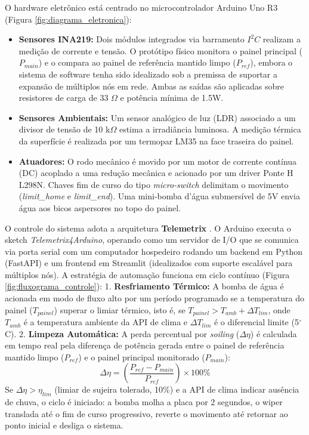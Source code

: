 \documentclass[a4paper,11pt]{article}
\begin{document}
O hardware eletrônico está centrado no microcontrolador Arduino Uno R3 (Figura \ref{fig:diagrama_eletronica}):
\begin{itemize}\setlength{\itemsep}{0pt}
    \item \textbf{Sensores INA219:} Dois módulos integrados via barramento $I^2C$ realizam a medição de corrente e tensão. O protótipo físico monitora o painel principal ($P_{main}$) e o compara ao painel de referência mantido limpo ($P_{ref}$), embora o sistema de software tenha sido idealizado sob a premissa de suportar a expansão de múltiplos nós em rede. Ambas as saídas são aplicadas sobre resistores de carga de 33 $\Omega$ e potência mínima de 1.5W.
    \item \textbf{Sensores Ambientais:} Um sensor analógico de luz (LDR) associado a um divisor de tensão de 10 k$\Omega$ estima a irradiância luminosa. A medição térmica da superfície é realizada por um termopar LM35 na face traseira do painel.
    \item \textbf{Atuadores:} O rodo mecânico é movido por um motor de corrente contínua (DC) acoplado a uma redução mecânica e acionado por um driver Ponte H L298N. Chaves fim de curso do tipo \textit{micro-switch} delimitam o movimento (\textit{limit\_home} e \textit{limit\_end}). Uma mini-bomba d'água submersível de 5V envia água aos bicos aspersores no topo do painel.
\end{itemize}


O controle do sistema adota a arquitetura \textbf{Telemetrix} \cite{telemetrix_doc}. O Arduino executa o sketch \textit{Telemetrix4Arduino}, operando como um servidor de I/O que se comunica via porta serial com um computador hospedeiro rodando um backend em Python (FastAPI) \cite{fastapi_doc} e um frontend em Streamlit \cite{streamlit_doc} (idealizados com suporte escalável para múltiplos nós). A estratégia de automação funciona em ciclo contínuo (Figura \ref{fig:fluxograma_controle}):
1. \textbf{Resfriamento Térmico:} A bomba de água é acionada em modo de fluxo alto por um período programado se a temperatura do painel ($T_{painel}$) superar o limiar térmico, isto é, se $T_{painel} > T_{amb} + \Delta T_{lim}$, onde $T_{amb}$ é a temperatura ambiente da API de clima e $\Delta T_{lim}$ é o diferencial limite (5$^\circ$C).
2. \textbf{Limpeza Automática:} A perda percentual por \textit{soiling} ($\Delta \eta$) é calculada em tempo real pela diferença de potência gerada entre o painel de referência mantido limpo ($P_{ref}$) e o painel principal monitorado ($P_{main}$):
\begin{equation} \label{eq:limpeza}
\Delta \eta = \left( \frac{P_{ref} - P_{main}}{P_{ref}} \right) \times 100\%
\end{equation}
Se $\Delta \eta > \eta_{lim}$ (limiar de sujeira tolerado, 10\%) e a API de clima indicar ausência de chuva, o ciclo é iniciado: a bomba molha a placa por 2 segundos, o wiper translada até o fim de curso progressivo, reverte o movimento até retornar ao ponto inicial e desliga o sistema.
\end{document}
